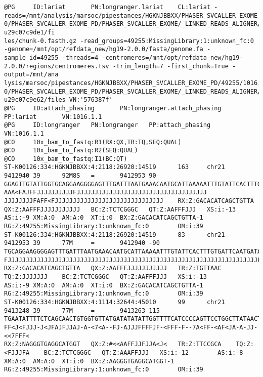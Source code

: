 \documentclass[]{article}
\begin{document}
\begin{verbatim}
@PG     ID:lariat       PN:longranger.lariat    CL:lariat -reads=/mnt/analysis/marsoc/pipestances/HGKNJBBXX/PHASER_SVCALLER_EXOME_PD/49255/1016.1.1-0/PHASER_SVCALLER_EXOME_PD/PHASER_SVCALLER_EXOME/_LINKED_READS_ALIGNER/_FASTQ_PREP_NEW/SORT_FASTQS/fork0/join-u29c07c9de1/fi
les/chunk-0.fasth.gz -read_groups=49255:MissingLibrary:1:unknown_fc:0 -genome=/mnt/opt/refdata_new/hg19-2.0.0/fasta/genome.fa -sample_id=49255 -threads=4 -centromeres=/mnt/opt/refdata_new/hg19-2.0.0/regions/centromeres.tsv -trim_length=7 -first_chunk=True -output=/mnt/ana
lysis/marsoc/pipestances/HGKNJBBXX/PHASER_SVCALLER_EXOME_PD/49255/1016.1.1-0/PHASER_SVCALLER_EXOME_PD/PHASER_SVCALLER_EXOME/_LINKED_READS_ALIGNER/BARCODE_AWARE_ALIGNER/fork0/chnk000-u29c07c9e62/files VN:'576387f'
@PG     ID:attach_phasing       PN:longranger.attach_phasing    PP:lariat       VN:1016.1.1
@PG     ID:longranger   PN:longranger   PP:attach_phasing       VN:1016.1.1
@CO     10x_bam_to_fastq:R1(RX:QX,TR:TQ,SEQ:QUAL)
@CO     10x_bam_to_fastq:R2(SEQ:QUAL)
@CO     10x_bam_to_fastq:I1(BC:QT)
ST-K00126:334:HGKNJBBXX:4:2118:26920:14519      163     chr21   9412940 39      92M8S   =       9412953 90      GGAGTTGTATTGGTGCAGGAAGGGGAGTTTGATTTAATGAAACAATGCATTAAAAATTTGTATTCACTTTGTGATTCAATGATAGTCAATGTTAACATAA    AAA<FAJFFJJJJJJJJJJFJJJJJJJJJJJJJJJJJJJJJJJJJJJJJJJJJJJJ
JJJJJJJJFAFF<FJJJJJJJJJJJJJJJJJJJJJJJJJJJJJJ    RX:Z:GACACATCAGCTGTTA   QX:Z:AAFFFJJJJJJJJJJJ   BC:Z:TCTCGGGC   QT:Z:AAFFFJJJ   XS:i:-13        AS:i:-9 XM:A:0  AM:A:0  XT:i:0  BX:Z:GACACATCAGCTGTTA-1 RG:Z:49255:MissingLibrary:1:unknown_fc:0        OM:i:39
ST-K00126:334:HGKNJBBXX:4:2118:26920:14519      83      chr21   9412953 39      77M     =       9412940 -90     TGCAGGAAGGGGAGTTTGATTTAATGAAACAATGCATTAAAAATTTGTATTCACTTTGTGATTCAATGATAGTCAAT   FJJJJJJJJJJJJJJJJJJJJJJJJJJJJJJJJJJJJJJJJJJJJJJJJJJJJJJJJJJJJJJJJJJJJJFJJJJJJ
RX:Z:GACACATCAGCTGTTA   QX:Z:AAFFFJJJJJJJJJJJ   TR:Z:TGTTAAC    TQ:Z:JJJJJJJ    BC:Z:TCTCGGGC   QT:Z:AAFFFJJJ   XS:i:-13        AS:i:-9 XM:A:0  AM:A:0  XT:i:0  BX:Z:GACACATCAGCTGTTA-1 RG:Z:49255:MissingLibrary:1:unknown_fc:0        OM:i:39
ST-K00126:334:HGKNJBBXX:4:1114:32644:45010      99      chr21   9413248 39      77M     =       9413263 115     TGAATATTTTCTCAGCAACTGTGGTGTTATGATATATATTGGTTTTCATCCCCAGTTCCTGGCTTATAACTCCCCTA   FF<J<FJJJ-J<JFAJFJJAJ-A-<7<A--FJ-AJJJFFFFJF-<FFF-F--7A<FF-<AF<JA-A-JJ-<<7FFF<
RX:Z:NAGGGTGAGGCATGGT   QX:Z:#<<AAFFJJFJJA<J<   TR:Z:TTCCGCA    TQ:Z:<FJJJFA    BC:Z:TCTCGGGC   QT:Z:AAAFFJJJ   XS:i:-12        AS:i:-8 XM:A:0  AM:A:0  XT:i:0  BX:Z:AAGGGTGAGGCATGGT-1 RG:Z:49255:MissingLibrary:1:unknown_fc:0        OM:i:39
\end{verbatim}
\end{document}
